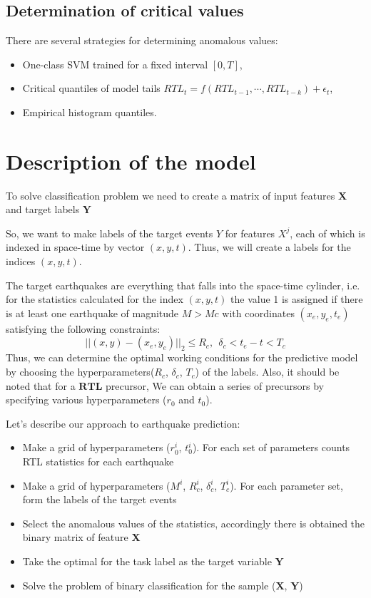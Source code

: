 \documentclass[12pt]{article}
\let\vec=\mathbf
\begin{document}
\subsection{Determination of critical values}
There are several strategies for determining anomalous values: 
\begin{itemize}
	\item One-class SVM trained for a fixed interval $[0, T]$,
	\item Critical quantiles of model tails $RTL_t=f(RTL_{t-1},\cdots,RTL_{t-k})+\epsilon_t$,
	\item Empirical histogram quantiles.
\end{itemize}
\section{Description of the model}
To solve classification problem we need to create a matrix of input features $\vec{X}$ and target labels $\vec{Y}$  

So, we want to make labels of the target events $Y$ for features $X^j$, each of which is indexed in space-time by vector $(x, y, t)$. Thus, we will create a labels for the indices $(x, y, t)$. 

The target earthquakes are everything that falls into the space-time cylinder, i.e. for the statistics calculated for the index $(x, y, t)$ the value 1 is assigned if there is at least one earthquake of magnitude $M> Mc$ with coordinates $(x_e, y_e, t_e)$ satisfying the following constraints:
\begin{equation}
||(x,y) - (x_e,y_e)||_2 	\leq R_c,~~
\delta_c <t_e-t<T_c
\end{equation}
Thus, we can  determine the optimal working conditions for the predictive model by choosing the hyperparameters($R_c$, $\delta_c$, $T_c$) of the labels. Also, it should be noted that for a $\vec{RTL}$ precursor, We can obtain a series of precursors by specifying various hyperparameters ($r_0$ and $t_0$).

Let's describe our approach to earthquake prediction:
\begin{itemize}
\item Make a grid of hyperparameters ($r_0^i$, $t_0^i$). For each set of parameters counts RTL statistics for each earthquake
\item Make a grid of hyperparameters ($M^i$, $R_c^i$, $\delta_c^i$, $T_c^i$). For each parameter set, form the labels of the target events
\item Select the anomalous values of the statistics, accordingly there is obtained the binary matrix of feature $\vec{X}$
\item Take the optimal for the task label as the target variable $\vec{Y}$ 
\item Solve the problem of binary classification for the sample ($\vec{X}$, $\vec{Y}$)
\end{itemize}
\end{document}
